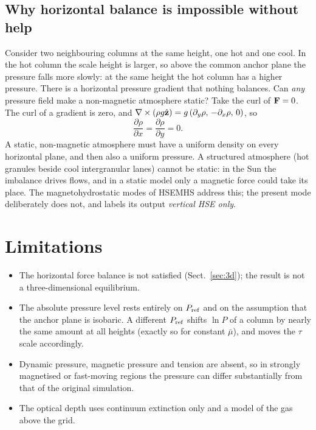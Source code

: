 \subsection{Why horizontal balance is impossible without help}
Consider two neighbouring columns at the same height, one hot and one cool. In the hot column the scale height is larger,
so above the common anchor plane the pressure falls more slowly: at the same height the hot column has a higher pressure.
There is a horizontal pressure gradient that nothing balances. Can \emph{any} pressure field make a non-magnetic
atmosphere static? Take the curl of $\mathbf F=0$. The curl of a gradient is zero, and
$\nabla\times(\rho g\hat{\mathbf z})=g\,(\partial_y\rho,\,-\partial_x\rho,\,0)$, so
\begin{equation}
\frac{\partial\rho}{\partial x}=\frac{\partial\rho}{\partial y}=0 .
\end{equation}
A static, non-magnetic atmosphere must have a uniform density on every horizontal plane, and then also a uniform pressure.
A structured atmosphere (hot granules beside cool intergranular lanes) cannot be static: in the Sun the imbalance drives
flows, and in a static model only a magnetic force could take its place. The magnetohydrostatic modes of HSEMHS address
this; the present mode deliberately does not, and labels its output \emph{vertical HSE only}.

\section{Limitations}
\begin{itemize}
\item The horizontal force balance is not satisfied (Sect.~\ref{sec:3d}); the result is not a three-dimensional equilibrium.
\item The absolute pressure level rests entirely on $P_{\rm ref}$ and on the assumption that the anchor plane is isobaric.
A different $P_{\rm ref}$ shifts $\ln P$ of a column by nearly the same amount at all heights (exactly so for constant
$\bar\mu$), and moves the $\tau$ scale accordingly.
\item Dynamic pressure, magnetic pressure and tension are absent, so in strongly magnetised or fast-moving regions the
pressure can differ substantially from that of the original simulation.
\item The optical depth uses continuum extinction only and a model of the gas above the grid.
\end{itemize}

